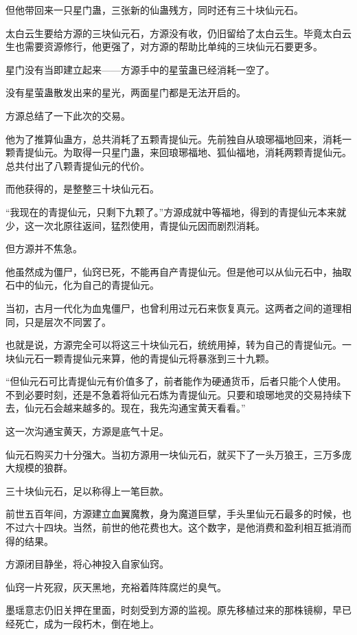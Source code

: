 \begin{this_body}
但他带回来一只星门蛊，三张新的仙蛊残方，同时还有三十块仙元石。

太白云生要给方源的三块仙元石，方源没有收，仍旧留给了太白云生。毕竟太白云生也需要资源修行，他更强了，对方源的帮助比单纯的三块仙元石要更多。

星门没有当即建立起来——方源手中的星萤蛊已经消耗一空了。

没有星萤蛊散发出来的星光，两面星门都是无法开启的。

方源总结了一下此次的交易。

他为了推算仙蛊方，总共消耗了五颗青提仙元。先前独自从琅琊福地回来，消耗一颗青提仙元。为取得一只星门蛊，来回琅琊福地、狐仙福地，消耗两颗青提仙元。总共付出了八颗青提仙元的代价。

而他获得的，是整整三十块仙元石。

“我现在的青提仙元，只剩下九颗了。”方源成就中等福地，得到的青提仙元本来就少，这一次北原往返间，猛烈使用，青提仙元因而剧烈消耗。

但方源并不焦急。

他虽然成为僵尸，仙窍已死，不能再自产青提仙元。但是他可以从仙元石中，抽取石中的仙元，化为自己的青提仙元。

当初，古月一代化为血鬼僵尸，也曾利用过元石来恢复真元。这两者之间的道理相同，只是层次不同罢了。

也就是说，方源完全可以将这三十块仙元石，统统用掉，转为自己的青提仙元。一块仙元石一颗青提仙元来算，他的青提仙元将暴涨到三十九颗。

“但仙元石可比青提仙元有价值多了，前者能作为硬通货币，后者只能个人使用。不到必要时刻，还是不急着将仙元石炼为青提仙元。只要和琅琊地灵的交易持续下去，仙元石会越来越多的。现在，我先沟通宝黄天看看。”

这一次沟通宝黄天，方源是底气十足。

仙元石购买力十分强大。当初方源用一块仙元石，就买下了一头万狼王，三万多庞大规模的狼群。

三十块仙元石，足以称得上一笔巨款。

前世五百年间，方源建立血翼魔教，身为魔道巨擘，手头里仙元石最多的时候，也不过六十四块。当然，前世的他花费也大。这个数字，是他消费和盈利相互抵消而得的结果。

方源闭目静坐，将心神投入自家仙窍。

仙窍一片死寂，灰天黑地，充裕着阵阵腐烂的臭气。

墨瑶意志仍旧关押在里面，时刻受到方源的监视。原先移植过来的那株镜柳，早已经死亡，成为一段朽木，倒在地上。


\end{this_body}
